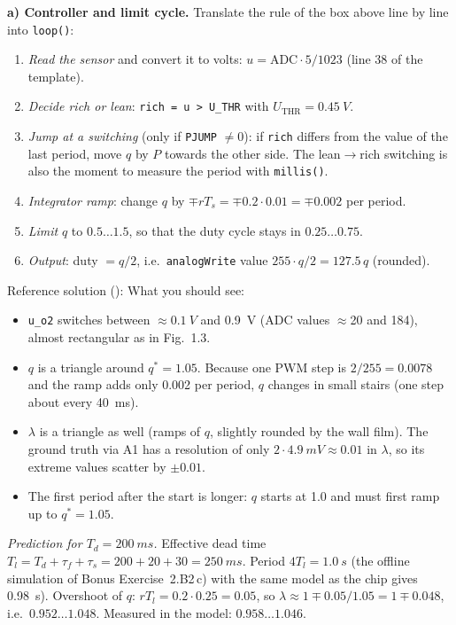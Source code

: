 \begin{solution}
\textbf{a) Controller and limit cycle.} Translate the rule of the box above
line by line into \texttt{loop()}:
\begin{enumerate}[label=Step \arabic*:,leftmargin=*,itemsep=1pt]
  \item \emph{Read the sensor} and convert it to volts:
    $u=\text{ADC}\cdot5/1023$ (line 38 of the template).
  \item \emph{Decide rich or lean}: \texttt{rich = u > U\_THR} with
    $U_{\text{THR}}=\SI{0.45}{V}$.
  \item \emph{Jump at a switching} (only if \texttt{PJUMP} $\neq0$): if
    \texttt{rich} differs from the value of the last period, move $q$ by $P$
    towards the other side. The lean$\to$rich switching is also the moment to
    measure the period with \texttt{millis()}.
  \item \emph{Integrator ramp}: change $q$ by $\mp rT_s=\mp0.2\cdot0.01=\mp0.002$
    per period.
  \item \emph{Limit} $q$ to $0.5\dots1.5$, so that the duty cycle stays in
    $0.25\dots0.75$.
  \item \emph{Output}: duty $=q/2$, i.e.\ \texttt{analogWrite} value
    $255\cdot q/2=127.5\,q$ (rounded).
\end{enumerate}
Reference solution ():
What you should see:
\begin{itemize}[itemsep=1pt]
  \item \texttt{u\_o2} switches between $\approx\SI{0.1}{V}$ and \SI{0.9}{V}
    (ADC values $\approx$20 and 184), almost rectangular as in Fig.~1.3.
  \item $q$ is a triangle around $q^*=1.05$. Because one PWM step is
    $2/255=0.0078$ and the ramp adds only 0.002 per period, $q$ changes in
    small stairs (one step about every \SI{40}{ms}).
  \item $\lambda$ is a triangle as well (ramps of $q$, slightly rounded by the
    wall film). The ground truth via A1 has a resolution of only
    $2\cdot\SI{4.9}{mV}\approx0.01$ in $\lambda$, so its extreme values scatter
    by $\pm0.01$.
  \item The first period after the start is longer: $q$ starts at 1.0 and
    must first ramp up to $q^*=1.05$.
\end{itemize}
\emph{Prediction for $T_d=\SI{200}{ms}$.} Effective dead time
$T_l=T_d+\tau_f+\tau_s=200+20+30=\SI{250}{ms}$. Period $4T_l=\SI{1.0}{s}$ (the
offline simulation of Bonus Exercise~2.B2\,c) with the same model as the chip
gives \SI{0.98}{s}). Overshoot of $q$: $rT_l=0.2\cdot0.25=0.05$, so
$\lambda\approx1\mp0.05/1.05=1\mp0.048$, i.e.\ $0.952\dots1.048$. Measured in
the model: $0.958\dots1.046$.


\end{solution}
